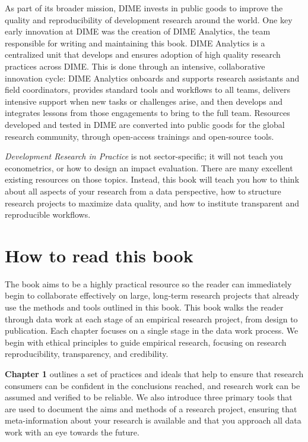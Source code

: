 \begin{fullwidth}
As part of its broader mission, DIME invests in public goods
to improve the quality and reproducibility of development research around the world.
One key early innovation at DIME was the creation of DIME Analytics,
the team responsible for writing and maintaining this book.
DIME Analytics is a centralized unit that develops and ensures adoption
of high quality research practices across DIME.
This is done through an intensive, collaborative innovation cycle:
DIME Analytics onboards and supports research assistants and field coordinators,
provides standard tools and workflows to all teams,
delivers intensive support when new tasks or challenges arise,
and then develops and integrates lessons from those engagements to bring to the full team.
Resources developed and tested in DIME are converted into public goods 
for the global research community, through open-access trainings and open-source tools.

\textit{Development Research in Practice} is not sector-specific;
it will not teach you econometrics,
or how to design an impact evaluation.
There are many excellent existing resources on those topics.
Instead, this book will teach you how to think about all aspects of your research from a data perspective,
how to structure research projects to maximize data quality,
and how to institute transparent and reproducible workflows.

\end{fullwidth}



\section{How to read this book}

The book aims to be a highly practical resource so the reader can
immediately begin to collaborate effectively on large, long-term research projects
that already use the methods and tools outlined in this book.
This book walks the reader through data work at each stage
of an empirical research project, from design to publication.
Each chapter focuses on a single stage in the data work process.
We begin with ethical principles to guide empirical research,
focusing on research reproducibility, transparency, and credibility.

\textbf{Chapter 1} outlines a set of practices and ideals that help to ensure that
research consumers can be confident in the conclusions reached,
and research work can be assumed and verified to be reliable.
We also introduce three primary tools that are used to document
the aims and methods of a research project,
ensuring that meta-information about your research is available
and that you approach all data work with an eye towards the future.

